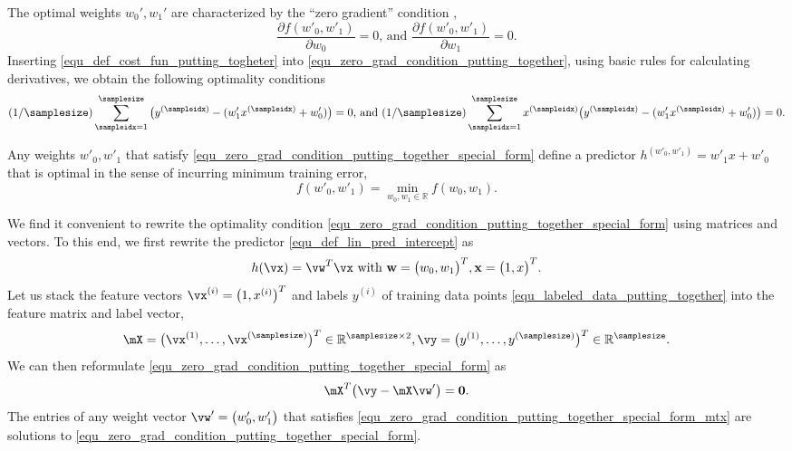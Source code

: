 \documentclass[12pt]{report}
\begin{document}
The optimal weights $w_{0}',w_{1}'$ are characterized by the ``zero gradient'' condition \cite{}, 
\begin{equation}
\label{equ_zero_grad_condition_putting_together}
\frac{\partial f(w'_{0},w'_{1})}{\partial w_{0}} = 0 \mbox{, and }\frac{\partial f(w'_{0},w'_{1})}{\partial w_{1}} = 0. 
\end{equation} 
Inserting \eqref{equ_def_cost_fun_putting_togheter} into \eqref{equ_zero_grad_condition_putting_together}, 
using basic rules for calculating derivatives, we obtain the following optimality conditions 
\begin{equation}
\label{equ_zero_grad_condition_putting_together_special_form}
 (1/\samplesize) \sum_{\sampleidx=1}^{\samplesize} \big( y^{(\sampleidx)} - ( w'_{1} x^{(\sampleidx)} + w'_{0}) \big)= 0 \mbox{, and } (1/\samplesize) \sum_{\sampleidx=1}^{\samplesize} x^{(\sampleidx)} \big( y^{(\sampleidx)} - ( w'_{1} x^{(\sampleidx)} + w'_{0}) \big) = 0. 
\end{equation} 

Any weights $w'_{0},w'_{1}$ that satisfy \eqref{equ_zero_grad_condition_putting_together_special_form} 
define a predictor $h^{(w'_{0},w'_{1})} = w'_{1}x + w'_{0}$ that 
is optimal in the sense of incurring minimum training error, 
$$f(w'_{0},w'_{1}) = \min_{w_{0},w_{1} \in \mathbb{R}} f(w_{0},w_{1}).$$

We find it convenient to rewrite the optimality condition \eqref{equ_zero_grad_condition_putting_together_special_form} 
using matrices and vectors. To this end, we first rewrite the 
predictor \eqref{equ_def_lin_pred_intercept} as 
$$ h(\vx) = \vw^{T} \vx \mbox{ with } \mathbf{w} = \big(w_{0},w_{1}\big)^{T}, \mathbf{x} = \big(1,x\big)^{T}.$$
Let us stack the feature vectors $\vx^{(i)} = \big(1,x^{(i)} \big)^{T}$ 
and labels $y^{(i)}$ of training data points \eqref{equ_labeled_data_putting_together} 
into the feature matrix and label vector, 
\begin{equation}
\mX  = \big(\vx^{(1)},\ldots,\vx^{(\samplesize)}\big)^{T} \in \mathbb{R}^{\samplesize \times 2}, \vy = \big(y^{(1)},\ldots,y^{(\samplesize)}\big)^{T} \in \mathbb{R}^{\samplesize}. 
\end{equation} 
We can then reformulate \eqref{equ_zero_grad_condition_putting_together_special_form} as 
\begin{equation}
\label{equ_zero_grad_condition_putting_together_special_form_mtx}
\mX^{T} \big( \vy - \mX \vw' \big) = \mathbf{0}. 
\end{equation} 
The entries of any weight vector $\vw' = \big(w_{0}',w_{1}'\big)$ that satisfies 
\eqref{equ_zero_grad_condition_putting_together_special_form_mtx} are solutions to 
\eqref{equ_zero_grad_condition_putting_together_special_form}. 
\end{document}
